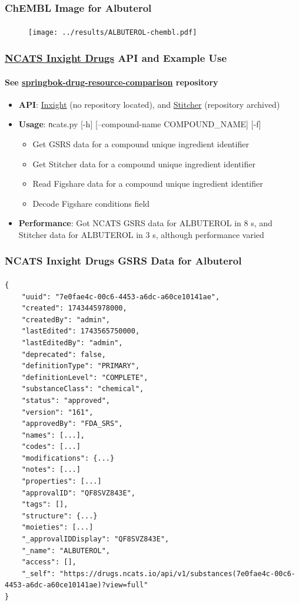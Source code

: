 \documentclass[aspectratio=169,xcolor=dvipsnames]{beamer}
\begin{document}
\begin{frame}
  \frametitle{ChEMBL Image for Albuterol}
  \framesubtitle{}
  \begin{figure}
    \begin{center}
      \texttt{[image: ../results/ALBUTEROL-chembl.pdf]}
    \end{center}
  \end{figure}
\end{frame}

\begin{frame}
  \frametitle{\href{https://drugs.ncats.io/}{NCATS Inxight Drugs} API
    and Example Use}
  \framesubtitle{See
    \href{https://github.com/ralatsdc/springbok-drug-resource-comparison}{springbok-drug-resource-comparison}
    repository}
  \begin{itemize}
  \item[] \textbf{API}: \href{https://drugs.ncats.io/api}{Inxight} (no repository
    located), and \href{https://github.com/ncats/stitcher}{Stitcher}
    (repository archived)
    \vspace{0.5\baselineskip}
  \item[] \textbf{Usage}: {\texttt ncats.py [-h] [--compound-name COMPOUND\_NAME]
    [-f]}
    \begin{itemize}
    \item Get GSRS data for a compound unique ingredient identifier
    \item Get Stitcher data for a compound unique ingredient identifier
    \item Read Figshare data for a compound unique ingredient identifier
    \item Decode Figshare conditions field
    \end{itemize}
    \vspace{0.5\baselineskip}
  \item[] \textbf{Performance}: Got NCATS GSRS data for ALBUTEROL in 8 s, and
    Stitcher data for ALBUTEROL in 3 s, although performance varied
  \end{itemize}
\end{frame}

\begin{frame}[fragile,t]
  \frametitle{NCATS Inxight Drugs GSRS Data for Albuterol}
  \framesubtitle{}
  \tiny
\begin{verbatim}
{
    "uuid": "7e0fae4c-00c6-4453-a6dc-a60ce10141ae",
    "created": 1743445978000,
    "createdBy": "admin",
    "lastEdited": 1743565750000,
    "lastEditedBy": "admin",
    "deprecated": false,
    "definitionType": "PRIMARY",
    "definitionLevel": "COMPLETE",
    "substanceClass": "chemical",
    "status": "approved",
    "version": "161",
    "approvedBy": "FDA_SRS",
    "names": [...],
    "codes": [...]
    "modifications": {...}
    "notes": [...]
    "properties": [...]
    "approvalID": "QF8SVZ843E",
    "tags": [],
    "structure": {...}
    "moieties": [...]
    "_approvalIDDisplay": "QF8SVZ843E",
    "_name": "ALBUTEROL",
    "access": [],
    "_self": "https://drugs.ncats.io/api/v1/substances(7e0fae4c-00c6-4453-a6dc-a60ce10141ae)?view=full"
}
\end{verbatim}
\end{frame}
\end{document}
